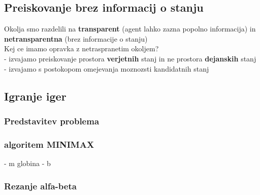 \subsection{Preiskovanje brez informacij o stanju}
Okolja smo razdelili na \textbf{transparent} (agent lahko zazna popolno informacija) in \textbf{netransparentna} (brez informacije o stanju)\\
Kej ce imamo opravka z netraspranetim okoljem?\\
- izvajamo preiskovanje prostora \textbf{verjetnih} stanj in ne prostora \textbf{dejanskih} stanj\\
- izvajamo s postokopom omejevanja moznozsti kandidatnih stanj\

\subsection{Igranje iger}

\subsubsection{Predstavitev problema}

\subsubsection{algoritem MINIMAX}
- m globina
- b 

\subsubsection{Rezanje alfa-beta}
